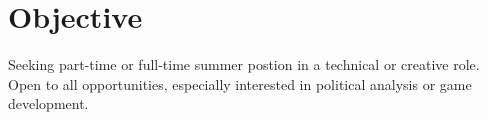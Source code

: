 \documentclass[letterpaper]{twentysecondcv} %
\begin{document}





\skillstext{}


\makeprofile %


\section{Objective}


Seeking part-time or full-time summer postion in a technical or creative role. Open to all opportunities, especially interested in political analysis or game development.


   

\vspace{32pt} %

\end{document}

